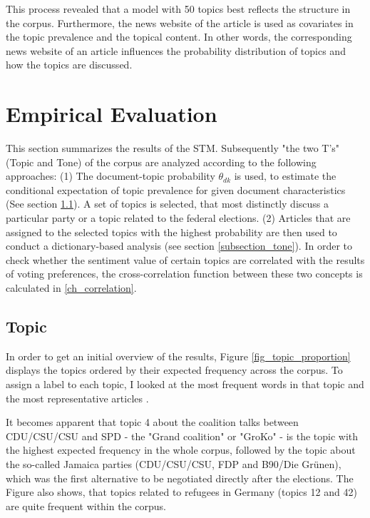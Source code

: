 \documentclass[12pt,a4paper,notitlepage]{article}
\begin{document}
This process revealed that a model with 50 topics best reflects the structure in the corpus. Furthermore, the news website of the article is used as covariates in the topic prevalence and the topical content. In other words, the corresponding news website of an article influences the probability distribution of topics and how the topics are discussed. 

\section{Empirical Evaluation}\label{ch_empirical}

This section summarizes the results of the STM. Subsequently "the two T's" (Topic and Tone) of the corpus are analyzed according to the following approaches: (1) The document-topic probability $\theta_{dk}$ is used, to estimate the conditional expectation of topic prevalence for given document characteristics (See section \ref{subsection_topic}). A set of topics is selected, that most distinctly discuss a particular party or a topic related to the federal elections. (2) Articles that are assigned to the selected topics with the highest probability are then used to conduct a dictionary-based analysis (see section \ref{subsection_tone}). In order to check whether the sentiment value of certain topics are correlated with the results of voting preferences, the cross-correlation function between these two concepts is calculated in \ref{ch_correlation}.

\subsection{Topic}\label{subsection_topic}

In order to get an initial overview of the results, Figure \ref{fig_topic_proportion} displays the topics ordered by their expected frequency across the corpus. To assign a label to each topic, I looked at the most frequent words in that topic and the most representative articles \citep{roberts_model_2016}. 

It becomes apparent that topic 4 about the coalition talks between CDU/CSU/CSU and SPD - the "Grand coalition" or "GroKo" - is the topic with the highest expected frequency in the whole corpus, followed by the topic about the so-called Jamaica parties (CDU/CSU/CSU, FDP and B90/Die Grünen), which was the first alternative to be negotiated directly after the elections. The Figure also shows, that topics related to refugees in Germany (topics 12 and 42) are quite frequent within the corpus. 
\end{document}
